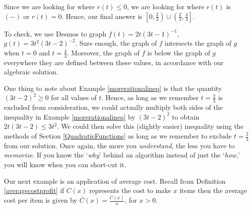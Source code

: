 \documentclass{ximera}
\begin{document}
\begin{example}
Since we are looking for where $r(t) \leq 0$, we are looking for where $r(t)$ is $(-)$ or $r(t) = 0$. Hence,  our final answer is $\left[0, \frac{2}{3} \right) \cup \left(\frac{2}{3}, \frac{4}{3} \right]$. 

To check, we use Desmos to graph $f(t) = 2t(3t-1)^{-1}$, $g(t) = 3t^2(3t-2)^{-2}$.  Sure enough, the graph of $f$ intersects the graph of $g$ when $t = 0$ and $t = \frac{4}{3}$.  Moreover, the graph of $f$ is below the graph of $g$ everywhere they are defined between these values, in accordance with our algebraic solution.







\begin{center} 
\end{center}

\end{example}

One thing to note about Example \ref{morerationalineq} is that the quantity $(3t-2)^2 \geq 0$ for all values of $t$.  Hence, as long as we remember $t = \frac{2}{3}$ is excluded from consideration, we could actually multiply both sides of the inequality in  Example \ref{morerationalineq} by $(3t-2)^2$ to obtain $2t(3t-2) \leq 3t^2$.  We could then solve this (slightly easier) inequality using the methods of Section \ref{QuadraticFunctions} as long as we remember to exclude $t = \frac{2}{3}$  from our solution. Once again, the more you \textit{understand}, the less you have to \textit{memorize}.  If you know the `\textit{why}' behind an algorithm instead of just the `\textit{how},' you will know when you can short-cut it.

Our next example is an application of average cost.  Recall from Definition \ref{averagecostprofit} if $C(x)$ represents the cost to make $x$ items then the average cost per item  is given by $\overline{C}(x) = \frac{C(x)}{x}$, for $x>0$. 
\end{document}
